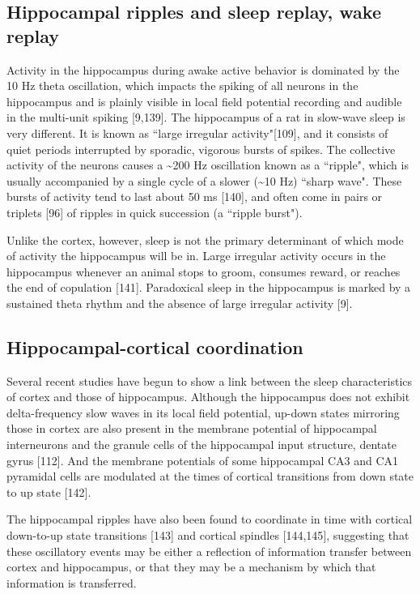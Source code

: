 \documentclass[]{article}
\begin{document}
\subsection{Hippocampal ripples and sleep replay, wake replay}

Activity in the hippocampus during awake active behavior is dominated by
the 10 Hz theta oscillation, which impacts the spiking of all neurons in
the hippocampus and is plainly visible in local field potential
recording and audible in the multi-unit spiking {[}9,139{]}. The
hippocampus of a rat in slow-wave sleep is very different. It is known
as ``large irregular activity"{[}109{]}, and it consists of quiet
periods interrupted by sporadic, vigorous bursts of spikes. The
collective activity of the neurons causes a \textasciitilde{}200 Hz
oscillation known as a ``ripple", which is usually accompanied by a
single cycle of a slower (\textasciitilde{}10 Hz) ``sharp wave". These
bursts of activity tend to last about 50 ms {[}140{]}, and often come in
pairs or triplets {[}96{]} of ripples in quick succession (a ``ripple
burst").

Unlike the cortex, however, sleep is not the primary determinant of
which mode of activity the hippocampus will be in. Large irregular
activity occurs in the hippocampus whenever an animal stops to groom,
consumes reward, or reaches the end of copulation {[}141{]}. Paradoxical
sleep in the hippocampus is marked by a sustained theta rhythm and the
absence of large irregular activity {[}9{]}.

\subsection{Hippocampal-cortical coordination}

Several recent studies have begun to show a link between the sleep
characteristics of cortex and those of hippocampus. Although the
hippocampus does not exhibit delta-frequency slow waves in its local
field potential, up-down states mirroring those in cortex are also
present in the membrane potential of hippocampal interneurons and the
granule cells of the hippocampal input structure, dentate gyrus
{[}112{]}. And the membrane potentials of some hippocampal CA3 and CA1
pyramidal cells are modulated at the times of cortical transitions from
down state to up state {[}142{]}.

The hippocampal ripples have also been found to coordinate in time with
cortical down-to-up state transitions {[}143{]} and cortical spindles
{[}144,145{]}, suggesting that these oscillatory events may be either a
reflection of information transfer between cortex and hippocampus, or
that they may be a mechanism by which that information is transferred.
\end{document}

